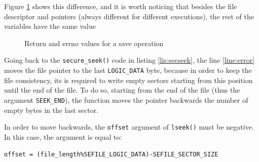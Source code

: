 \vspace{7pt}
Figure \ref{fig:errordebug} shows this difference, and it is worth noticing that besides the file descriptor and pointers (always different for different executions), the rest of the variables have the same value
\begin{figure}[ht]
  \centering
  {}
  \caption{Return and errno values for a save operation}
 \label{fig:errordebug}
\end{figure}

Going back to the \texttt{secure\_seek()} code in listing \ref{lis:secseek}, the line \ref{line:error} moves the file pointer to the last \texttt{LOGIC\_DATA} byte, because in order to keep the file consistency, its is required to write empty sectors starting from this position until the end of the file. To do so, starting from the end of the file (thus the argument \texttt{SEEK\_END}), the function moves the pointer backwards the number of empty bytes in the last sector.

In order to move backwards, the \texttt{offset} argument of \texttt{lseek()} must be negative. In this case, the argument is equal to: 

\lstset{style=customc}
\lstinline"offset = (file_length%SEFILE_LOGIC_DATA)-SEFILE_SECTOR_SIZE"

